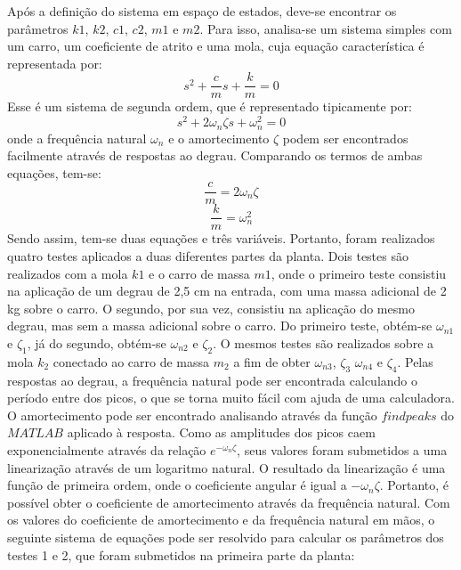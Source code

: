 \documentclass{ifacconf}
\begin{document}
Após a definição do sistema em espaço de estados, deve-se encontrar os parâmetros
$k1$, $k2$, $c1$, $c2$, $m1$ e $m2$. Para isso, analisa-se um sistema simples com um carro, um coeficiente de atrito e uma mola,
cuja equação característica é representada por:
\begin{equation}
  s^2 + \frac{c}{m}s + \frac{k}{m} = 0
\end{equation}
Esse é um sistema de segunda ordem, que é representado tipicamente por:
\begin{equation}
  s^2 + 2\omega_n \zeta s + \omega_n^2 = 0
\end{equation}
onde a frequência natural $\omega_n$ e o amortecimento $\zeta$ podem ser
encontrados facilmente através de respostas ao degrau.
Comparando os termos de ambas equações, tem-se:
\begin{equation}
  \label{eq:termo1}
  \frac{c}{m} = 2\omega_n \zeta
\end{equation}
\begin{equation}
  \label{eq:termo2}
  \frac{k}{m} = \omega_n^2
\end{equation}
Sendo assim, tem-se duas equações e três variáveis. Portanto, foram realizados quatro testes aplicados a duas diferentes partes da planta.
Dois testes são realizados com a mola $k1$ e o carro de massa $m1$, onde o primeiro teste consistiu na aplicação de um degrau de 2,5 cm
na entrada, com uma massa adicional de 2 kg sobre o carro. O segundo, por sua vez, consistiu na aplicação do mesmo degrau, mas sem a massa
adicional sobre o carro. Do primeiro teste, obtém-se $\omega_{n1}$ e $\zeta_1$, já do segundo, obtém-se $\omega_{n2}$ e $\zeta_2$.
O mesmos testes são realizados sobre a mola $k_2$ conectado ao carro de massa $m_2$ a fim de obter $\omega_{n3}$, $\zeta_3$ $\omega_{n4}$ e $\zeta_4$.
Pelas respostas ao degrau, a frequência natural pode ser encontrada calculando o período entre dos picos, o que se torna muito fácil com ajuda de uma calculadora.
O amortecimento pode ser encontrado analisando através da função $findpeaks$ do $MATLAB$ aplicado à resposta. Como as amplitudes dos picos caem exponencialmente através da relação
$e^{-\omega_n \zeta}$, seus valores foram submetidos a uma linearização através de um logaritmo
natural. O resultado da linearização é uma função de primeira ordem, onde o coeficiente angular é igual a $-\omega_n \zeta$.
Portanto, é possível obter o coeficiente de amortecimento através da frequência natural.
Com os valores do coeficiente de amortecimento e da frequência natural em mãos, o seguinte sistema de equações
pode ser resolvido para calcular os parâmetros dos testes 1 e 2, que foram submetidos na primeira parte da planta:
\end{document}
